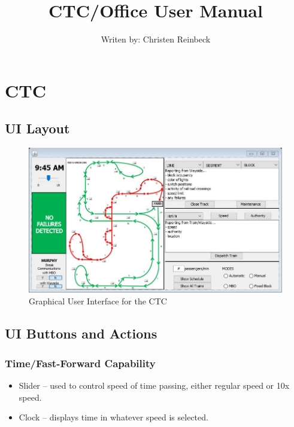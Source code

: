 


\title{CTC/Office User Manual}
\author {Writen by: Christen Reinbeck}
\date{}

\maketitle

\section{CTC}

\subsection{UI Layout}

\begin{figure}[h!]
	\center
	\includegraphics[width=16cm]{CTC_gui}
	\caption{Graphical User Interface for the CTC}
\end{figure}

\subsection{UI Buttons and Actions}
	
	\subsubsection{Time/Fast-Forward Capability}
		\begin{itemize}
			\item Slider – used to control speed of time passing, either regular speed or 10x speed.
			\item Clock – displays time in whatever speed is selected.
		\end{itemize}

